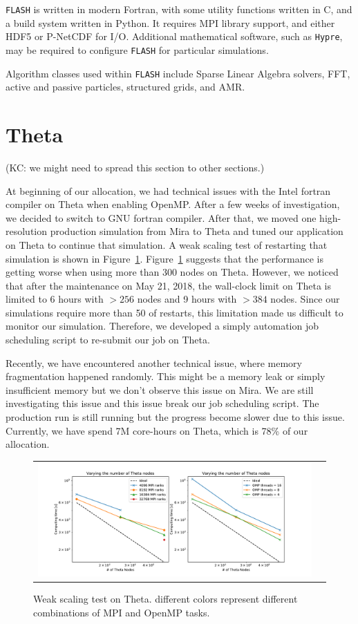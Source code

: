 \documentclass[12pt,titlepage]{article}
\begin{document}
\texttt{FLASH} is written in modern Fortran, with some utility
functions written in C, and a build system written in Python.  It
requires MPI library support, and either HDF5 or P-NetCDF for I/O.
Additional mathematical software, such as \texttt{Hypre}, may be
required to configure \texttt{FLASH} for particular simulations.

Algorithm classes used within \texttt{FLASH} include Sparse Linear
Algebra solvers, FFT, active and passive particles, structured grids,
and AMR.


\section{Theta}

(KC: we might need to spread this section to other sections.)

At beginning of our allocation, we had technical issues with the Intel fortran compiler on Theta when enabling OpenMP.
After a few weeks of investigation, we decided to switch to GNU fortran compiler.    
After that, we moved one high-resolution production simulation from Mira to Theta 
and tuned our application on Theta to continue that simulation. 
A weak scaling test of restarting that simulation is shown in Figure~\ref{fig:theta}.
Figure~\ref{fig:theta} suggests that the performance is getting worse when using more than 300 nodes on Theta.
However, we noticed that after the maintenance on May 21, 2018, the wall-clock limit on Theta is limited to 6 hours 
with $> 256$ nodes and 9 hours with $> 384$ nodes.
Since our simulations require more than 50 of restarts, this limitation made us difficult to monitor our simulation.
Therefore, we developed a simply automation job scheduling script to re-submit our job on Theta.    
 
Recently, we have encountered another technical issue, where memory fragmentation happened randomly. 
This might be a memory leak or simply insufficient memory but we don't observe this issue on Mira. 
We are still investigating this issue and this issue break our job scheduling script.
The production run is still running but the progress become slower due to this issue.    
Currently, we have spend 7M core-hours on Theta, which is 78\% of our allocation. 

\begin{figure}
  \begin{tabular}{cc}
    \includegraphics[width=6.5in]{./theta/fig_theta_scaling_j4.pdf}
  \end{tabular}
  \caption{Weak scaling test on Theta. different colors represent different combinations of MPI and OpenMP tasks. }
  \label{fig:theta}
\end{figure}
\end{document}

